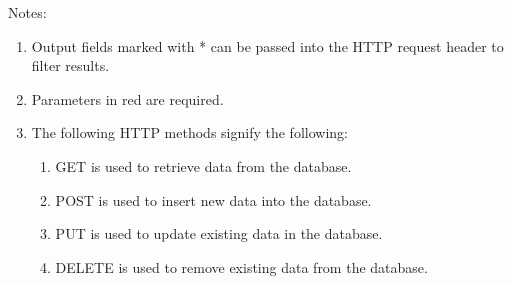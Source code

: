 \documentclass{article}
\begin{document}
Notes:
\begin{enumerate}
    \item Output fields marked with * can be passed into the HTTP request header to filter results.
    \item Parameters in red are required.
    \item The following HTTP methods signify the following:
    \begin{enumerate}
        \item GET is used to retrieve data from the database.
        \item POST is used to insert new data into the database.
        \item PUT is used to update existing data in the database.
        \item DELETE is used to remove existing data from the database.
    \end{enumerate}
\end{enumerate}
\end{document}
